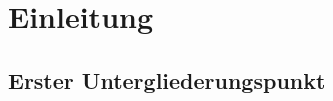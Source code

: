 %
%



\chapter{Einleitung}
\section{Erster Untergliederungspunkt}

 


\begin{appendix}
    \clearpage    
    \setdefaultleftmargin{1em}{}{}{}{}{}     
\end{appendix}